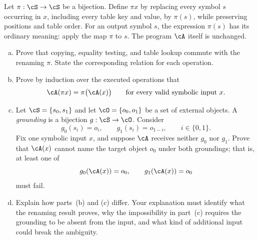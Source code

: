 \begin{exercisechunk}
Let \(\pi:\cS\to\cS\) be a bijection. Define \(\pi x\) by replacing every
symbol \(s\) occurring in \(x\), including every table key and value, by
\(\pi(s)\), while preserving positions and table order. For an output symbol
\(s\), the expression \(\pi(s)\) has its ordinary meaning: apply the map
\(\pi\) to \(s\). The program \(\cA\) itself is unchanged.
\begin{enumerate}[(a),beginpenalty=10000]
\item Prove that copying, equality testing, and table lookup commute with the
renaming \(\pi\). State the corresponding relation for each operation.
\item Prove by induction over the executed operations that
\[
 \cA(\pi x)=\pi\bigl(\cA(x)\bigr)
 \qquad\text{for every valid symbolic input }x.
\]
\item Let \(\cS=\{s_0,s_1\}\) and let
\(\cO=\{o_0,o_1\}\) be a set of external objects. A \emph{grounding} is a
bijection \(g:\cS\to\cO\). Consider
\[
 g_0(s_i)=o_i,
 \qquad
 g_1(s_i)=o_{1-i},
 \qquad i\in\{0,1\}.
\]
Fix one symbolic input \(x\), and suppose \(\cA\) receives neither \(g_0\)
nor \(g_1\). Prove that \(\cA(x)\) cannot name the target object \(o_0\)
under both groundings; that is, at least one of
\[
 g_0(\cA(x))=o_0,
 \qquad
 g_1(\cA(x))=o_0
\]
must fail.
\item Explain how parts~(b) and (c) differ. Your explanation must identify
what the renaming result proves, why the impossibility in part~(c) requires
the grounding to be absent from the input, and what kind of additional input
could break the ambiguity.
\end{enumerate}
\end{exercisechunk}
